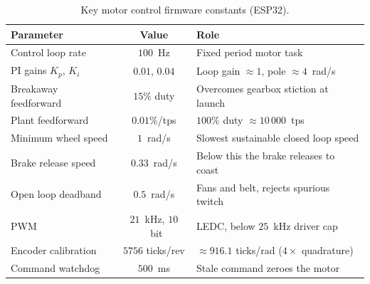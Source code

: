 \documentclass[11pt]{article}
\begin{document}
\begin{table}[H]
\centering
\small
\begin{tabularx}{\linewidth}{|Y|c|Y|}
\hline
\textbf{Parameter} & \textbf{Value} & \textbf{Role} \\
\hline
Control loop rate & $100$~Hz & Fixed period motor task \\
\hline
PI gains $K_p$, $K_i$ & $0.01$, $0.04$ & Loop gain $\approx 1$, pole $\approx 4$~rad/s \\
\hline
Breakaway feedforward & $15\%$ duty & Overcomes gearbox stiction at launch \\
\hline
Plant feedforward & $0.01\%$/tps & $100\%$ duty $\approx 10\,000$~tps \\
\hline
Minimum wheel speed & $1$~rad/s & Slowest sustainable closed loop speed \\
\hline
Brake release speed & $0.33$~rad/s & Below this the brake releases to coast \\
\hline
Open loop deadband & $0.5$~rad/s & Fans and belt, rejects spurious twitch \\
\hline
PWM & $21$~kHz, $10$~bit & LEDC, below $25$~kHz driver cap \\
\hline
Encoder calibration & $5756$ ticks/rev & $\approx 916.1$ ticks/rad ($4\times$ quadrature) \\
\hline
Command watchdog & $500$~ms & Stale command zeroes the motor \\
\hline
\end{tabularx}
\caption{Key motor control firmware constants (ESP32).}\label{tab:fwconst}
\end{table}
\end{document}
